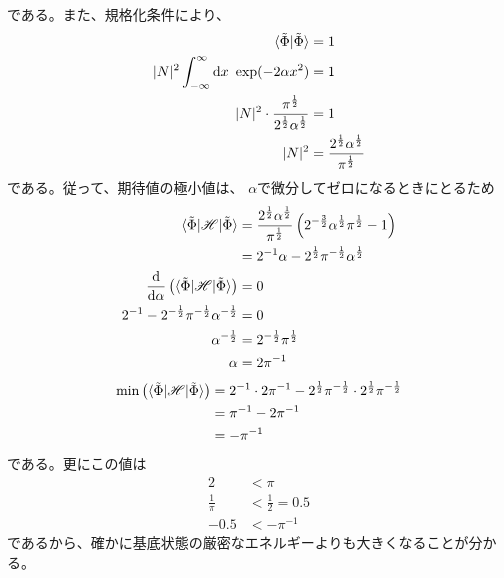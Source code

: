 である。また、規格化条件により、
\begin{align}
	\braket{\tilde{\Phi}|\tilde{\Phi}}
&=
	1 \\
%
%
	|N|^2
		\int_{-\infty}^{\infty} \d x\
			\exp(-2\alpha x^2)
&=
	1 \\
%
%
	|N|^2 \cdot
		\frac{
			\pi^{\frac{1}{2}}
		}{
			2^{\frac{1}{2}} \alpha^{\frac{1}{2}}
		}
&=
	1 \\
%
%
	|N|^2
&=
	\frac{
		2^{\frac{1}{2}} \alpha^{\frac{1}{2}}
	}{
		\pi^{\frac{1}{2}}
	}
\end{align}
である。従って、期待値の極小値は、
$\alpha$で微分してゼロになるときにとるため
\begin{align}
	\braket{\tilde{\Phi}|\mathscr{H}|\tilde{\Phi}}
&=
	\frac{
		2^{\frac{1}{2}} \alpha^{\frac{1}{2}}
	}{
		\pi^{\frac{1}{2}}
	}
		\left(
			2^{-\frac{3}{2}} \alpha^{\frac{1}{2}} \pi^{\frac{1}{2}}
			-
			1
		\right) \\
%
%
&=
	2^{-1} \alpha
	-
	2^{\frac{1}{2}} \pi^{-\frac{1}{2}} \alpha^{\frac{1}{2}} \\
%
%
	\frac{\d}{\d \alpha}\left(
		\braket{\tilde{\Phi}|\mathscr{H}|\tilde{\Phi}}
	\right)
&=
	0 \\
%
%
	2^{-1}
	-
	2^{-\frac{1}{2}} \pi^{-\frac{1}{2}} \alpha^{-\frac{1}{2}}
&=
	0 \\
%
%
	\alpha^{-\frac{1}{2}}
&=
	2^{-\frac{1}{2}} \pi^{\frac{1}{2}} \\
%
%
	\alpha
&=
	2 \pi^{-1}
\end{align}
\begin{align}
	\min\left(
		\braket{\tilde{\Phi}|\mathscr{H}|\tilde{\Phi}}
	\right)
&=
	2^{-1} \cdot 2\pi^{-1}
	-
	2^{\frac{1}{2}} \pi^{-\frac{1}{2}} \cdot 2^{\frac{1}{2}} \pi^{-\frac{1}{2}} \\
%
%
&=
	\pi^{-1}
	-
	2 \pi^{-1} \\
%
%
&=
	-\pi^{-1}
\end{align}
である。更にこの値は
\begin{align}
	2
&<
	\pi \\
%
%
	\frac{1}{\pi}
&<
	\frac{1}{2}
=
	0.5 \\
%
%
	-0.5
&<
	-\pi^{-1}
\end{align}
であるから、確かに基底状態の厳密なエネルギーよりも大きくなることが分かる。


